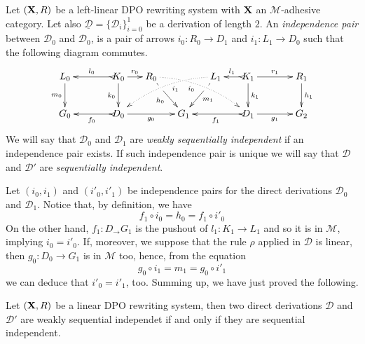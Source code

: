 \documentclass[a4paper,UKenglish,cleveref,pdftex, thm-restate,numberwithinsect]{lipics}
\def\R{\mathsf{R}}
\def\X{\textbf {\textup{X}}}
\newcommand{\dder}[1]{\mathscr{#1}}
\newcommand{\der}[1]{\underline{\dder{#1}}}
\begin{document}
\begin{definition}
  \label{de:sequential-independence}
  Let $(\X, \R)$ be a left-linear DPO rewriting system with $\X$ an $\mathcal{M}$-adhesive category. Let also $\der{D}=\{\dder{D}_i\}_{i=0}^1$ be a derivation of length $2$. 	An \emph{independence pair} between $\dder{D}_0$ and $\dder{D}_0$, is a pair of  arrows $i_0\colon R_0\to D_1$ and $i_1\colon L_1\to D_0$ such that the following diagram commutes.
	\[\xymatrix@C=15pt{L_0 \ar[d]_{m_0}&& K_0 \ar[d]_{k_0}\ar@{>->}[ll]_{l_0} \ar[r]^{r_0} & R_0 \ar@{.>}@/^.35cm/[drrr]|(.3)\hole_(.4){i_0} \ar[dr]|(.3)\hole_{h_0} && L_1 \ar@{.>}@/_.35cm/[dlll]^(.4){i_1} \ar[dl]|(.3)\hole^{m_1}& K_1 \ar[d]^{k_1}\ar@{>->}[l]_{l_1} \ar[rr]^{r_1} && R_1 \ar[d]^{h_1}\\G_0 && \ar@{>->}[ll]^{f_0} D_0 \ar[rr]_{g_0}&& G_1  && \ar@{>->}[ll]^{f_1} D_1 \ar[rr]_{g_1}&& G_2}\]
	We will say that $\dder{D}_0$ and $\dder{D}_1$ are \emph{weakly sequentially independent} if an independence pair exists. If such independence pair is unique we will say that $\dder{D}$ and $\dder{D'}$ are \emph{sequentially independent}.
\end{definition}

\begin{example}
\end{example}
\begin{example}
\end{example}


 Let $(i_0, i_1)$ and $(i'_0, i'_1)$ be independence pairs for the direct derivations $\dder{D}_0$ and $\dder{D}_1$. Notice that, by definition, we have
 \[f_1\circ i_0=h_0=f_1\circ i'_0\]
	On the other hand, 
	$f_1\colon D_\to G_1$ is  the pushout of $l_1\colon K_1\to L_1$ and so it is in $\mathcal{M}$, implying $i_0=i'_0$. If, moreover, we suppose that the rule $\rho$ applied in $\dder{D}$ is linear, then $g_0\colon D_0\to G_1$ is in $\mathcal{M}$ too, hence, from the equation
	\[
	g_0\circ i_1=m_1= g_0\circ i'_1\]
	we can deduce that $i'_0=i'_1$, too. Summing up, we have just proved the following.
	
	\begin{proposition}\label{rem:weak}
	Let $(\X, \R)$ be a linear DPO rewriting system, then two direct derivations $\dder{D}$ and $\dder{D}'$ are weakly sequential independet if and only if they are sequential independent. 
\end{proposition}
\end{document}
